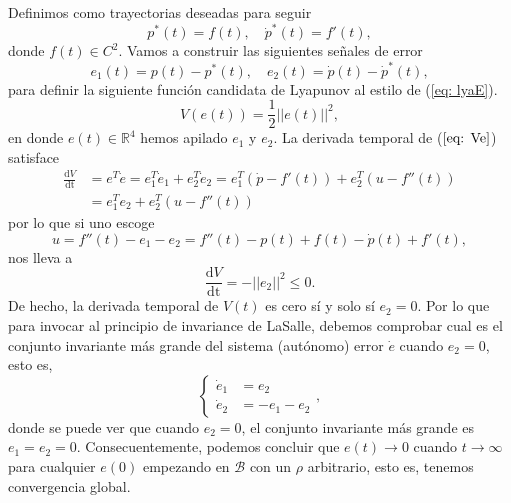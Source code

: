 Definimos como trayectorias deseadas para seguir
\begin{equation}
	p^*(t) = f(t), \quad \dot p^*(t) = f'(t),
\end{equation}
donde $f(t) \in C^2$.
Vamos a construir las siguientes señales de error
\begin{equation}
	e_1(t) = p(t) - p^*(t), \quad e_2(t) = \dot p(t) - \dot p^*(t),
\end{equation}
	para definir la siguiente función candidata de Lyapunov al estilo de (\ref{eq: lyaE}).
\begin{equation}
	V(e(t)) = \frac{1}{2}||e(t)||^2,
	\label{eq: Ve}
\end{equation}
	en donde $e(t)\in\mathbb{R}^4$ hemos apilado $e_1$ y $e_2$. La derivada temporal de ($\ref{eq: Ve}$) satisface
\begin{align}
	\frac{\mathrm{d}V}{\mathrm{dt}} &= e^T\dot e = e_1^T\dot e_1 + e_2^T\dot e_2 =  e_1^T(\dot p - f'(t)) + e_2^T(u - f''(t)) \nonumber \\
	&= e_1^Te_2 + e_2^T(u - f''(t))
\end{align}
por lo que si uno escoge
	\begin{equation}
	u = f''(t) - e_1 - e_2 = f''(t) - p(t) + f(t) -\dot p(t) + f'(t),
	\label{eq: ue}
	\end{equation}
nos lleva a
	\begin{equation}
\frac{\mathrm{d}V}{\mathrm{dt}} = -||e_2||^2 \leq 0.
	\end{equation}
	De hecho, la derivada temporal de $V(t)$ es cero sí y solo sí $e_2 = 0$. Por lo que para invocar al principio de invariance de LaSalle, debemos comprobar cual es el conjunto invariante más grande del sistema (autónomo) error $\dot e$ cuando $e_2 = 0$, esto es,
	\begin{equation}
	\begin{cases}
	\dot e_1 &= e_2 \\
	\dot e_2 &= -e_1 -e_2
	\end{cases},
	\end{equation}
	donde se puede ver que cuando $e_2 = 0$, el conjunto invariante más grande es $e_1 = e_2 = 0$. Consecuentemente, podemos concluir que $e(t) \to 0$ cuando $t\to\infty$ para cualquier $e(0)$ empezando en $\mathcal{B}$ con un $\rho$ arbitrario, esto es, tenemos convergencia global.

